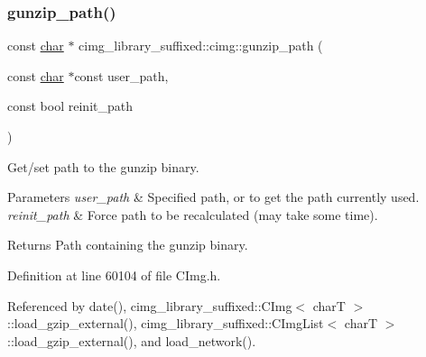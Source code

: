 \subsubsection{\texorpdfstring{gunzip\+\_\+path()}{gunzip\_path()}}
{\footnotesize\ttfamily const \hyperlink{classchar}{char} $\ast$ cimg\+\_\+library\+\_\+suffixed\+::cimg\+::gunzip\+\_\+path (\begin{DoxyParamCaption}\item[{const \hyperlink{classchar}{char} $\ast$const}]{user\+\_\+path,  }\item[{const bool}]{reinit\+\_\+path }\end{DoxyParamCaption})\hspace{0.3cm}{\ttfamily [inline]}}



Get/set path to the {\ttfamily gunzip} binary. 


\begin{DoxyParams}{Parameters}
{\em user\+\_\+path} & Specified path, or {} to get the path currently used. \\
\hline
{\em reinit\+\_\+path} & Force path to be recalculated (may take some time). \\
\hline
\end{DoxyParams}
\begin{DoxyReturn}{Returns}
Path containing the {\ttfamily gunzip} binary. 
\end{DoxyReturn}


Definition at line 60104 of file C\+Img.\+h.



Referenced by date(), cimg\+\_\+library\+\_\+suffixed\+::\+C\+Img$<$ char\+T $>$\+::load\+\_\+gzip\+\_\+external(), cimg\+\_\+library\+\_\+suffixed\+::\+C\+Img\+List$<$ char\+T $>$\+::load\+\_\+gzip\+\_\+external(), and load\+\_\+network().


